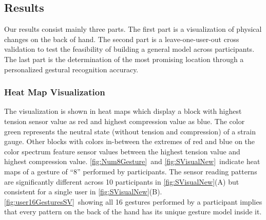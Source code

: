 \documentclass{sigchi}
\begin{document}
\subsection{Results}

Our results consist mainly three parts. The first part is a visualization of physical changes on the back of hand. The second part is a leave-one-user-out cross validation to test the feasibility of building a general model across participants. The last part is the determination of the most promising location through a personalized gestural recognition accuracy.


\subsubsection{Heat Map Visualization}
The visualization is shown in heat maps which display a block with highest tension sensor value as red and highest compression value as blue. The color green represents the neutral state (without tension and compression) of a strain gauge. Other blocks with colors in-between the extremes of red and blue on the color spectrum feature sensor values between the highest tension value and highest compression value. \autoref{fig:Num8Gesture}\ and \autoref{fig:SVisualNew}\ indicate heat maps of a gesture of ``8'' performed by participants. The sensor reading patterns are significantly different across 10 participants in \autoref{fig:SVisualNew}(A) but consistent for a single user in \autoref{fig:SVisualNew}(B). \autoref{fig:user16GesturesSV}\ showing all 16 gestures performed by a participant implies that every pattern on the back of the hand has its unique gesture model inside it.
\end{document}
